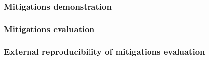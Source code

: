 \documentclass{article}
\begin{document}

\subsubsection{Mitigations demonstration}


\subsubsection{Mitigations evaluation}


\subsubsection{External reproducibility of mitigations evaluation}

\end{document}
